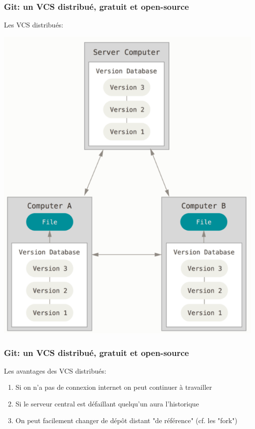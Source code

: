 \documentclass{beamer}
\begin{document}
\begin{frame}
\frametitle{Git: un VCS distribué, gratuit et open-source}
Les VCS distribués:
\begin{center}
    \includegraphics[scale=0.25]{images/vcs/vcs_distributed.png}
\end{center}
\end{frame}

\begin{frame}
\frametitle{Git: un VCS distribué, gratuit et open-source}
Les avantages des VCS distribués:
\begin{enumerate}
    \item Si on n'a pas de connexion internet on peut continuer à travailler
    \item Si le serveur central est défaillant quelqu'un aura l'historique
    \item On peut facilement changer de dépôt distant "de référence" (cf. les "fork")
\end{enumerate}
\end{frame}
\end{document}
